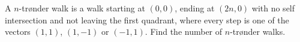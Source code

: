 A $n$-trønder walk is a walk starting at $(0, 0)$,  ending at $(2n, 0)$ with no self intersection and not leaving the first quadrant, where every step is one of the vectors $(1, 1)$,  $(1, -1)$ or $(-1, 1)$. Find the number of $n$-trønder walks.